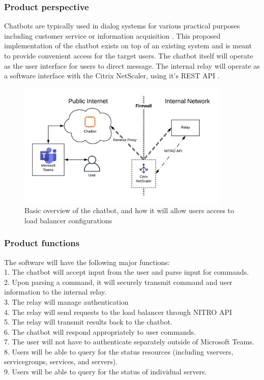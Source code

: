 \documentclass[onecolumn, draftclsnofoot,10pt, compsoc]{IEEEtran}
\begin{document}
\subsubsection{Product perspective}
Chatbots are typically used in dialog systems for various practical purposes including customer service or information acquisition \cite{chatbot}.
This proposed implementation of the chatbot exists on top of an existing system and is meant to provide convenient access for the target users.
The chatbot itself will operate as the user interface for users to direct message.
The internal relay will operate as a software interface with the Citrix NetScaler, using it's REST API \cite{citrixnitro}.
\begin{figure}[h]
    \centering
    \includegraphics[height=6cm]{overview.png}
    \caption[Basic overview of the chatbot]{Basic overview of the chatbot, and how it will allow users access to load balancer configurations}
    \label{fig:NetScaler Chatbot}
\end{figure}

\subsubsection{Product functions}
The software will have the following major functions:
\\1. The chatbot will accept input from the user and parse input for commands.
\\2. Upon parsing a command, it will securely transmit command and user information to the internal relay.
\\3. The relay will manage authentication
\\4. The relay will send requests to the load balancer through NITRO API
\\5. The relay will transmit results back to the chatbot.
\\6. The chatbot will respond appropriately to user commands.
\\7. The user will not have to authenticate separately outside of Microsoft Teams.
\\8. Users will be able to query for the status resources (including vservers, servicegroups, services, and servers).
\\9. Users will be able to query for the status of individual servers.
\end{document}
